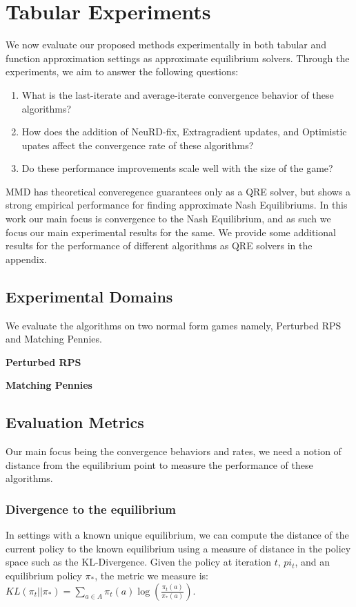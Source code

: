\chapter{Tabular Experiments}

We now evaluate our proposed methods experimentally in both tabular and function approximation
settings as approximate equilibrium solvers.
Through the experiments, we aim to answer the following questions:
\begin{enumerate}
	\item {What is
	      the last-iterate and average-iterate convergence behavior of these algorithms?
	      }\label{qn1}
	\item {How does the addition of NeuRD-fix, Extragradient updates, and Optimistic upates
	      affect the convergence rate of these algorithms?}\label{qn2}
	\item {Do these performance improvements scale well with the size of the game?}\label{qn3}
\end{enumerate}

MMD has theoretical converegence guarantees only as a QRE solver, but shows a strong empirical
performance for finding approximate Nash Equilibriums.
In this work our main focus is convergence to the Nash Equilibrium, and as such we focus our main
experimental results for the same.
We provide some additional results for the performance of different algorithms as QRE solvers in
the appendix.

\section{Experimental Domains}
We evaluate the algorithms on two normal form games namely, Perturbed RPS and Matching Pennies.

\textbf{Perturbed RPS}

\textbf{Matching Pennies}

\section{Evaluation
  Metrics}
Our main focus being the convergence behaviors and rates, we need a notion of distance from the
equilibrium point to measure the performance of these algorithms.

\subsection{Divergence to the equilibrium}
In settings with a known unique equilibrium, we can compute the distance of the current policy to
the known equilibrium using a measure of distance in the policy space such as the KL-Divergence.
Given the policy at iteration $t$, $pi_t$, and an equilibrium policy $\pi_*$, the metric we measure
is: $KL(\pi_t || \pi_*) = \sum_{a \in A} \pi_t(a) \log \left( \frac{\pi_t(a)}{\pi_*(a)} \right)$.

